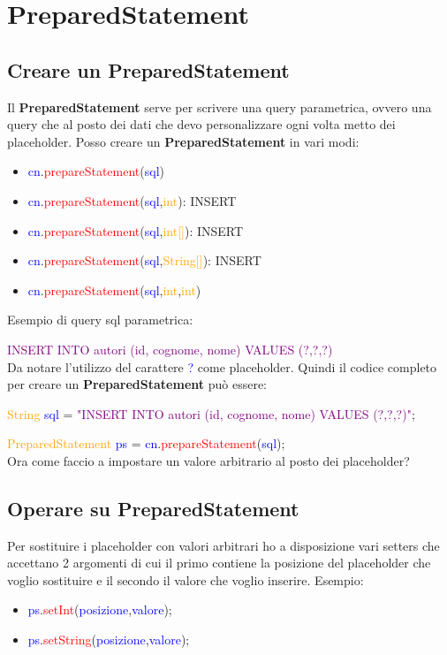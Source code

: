 \documentclass[11pt, letterpaper, titlepage]{article}
\begin{document}
\section{PreparedStatement}

\subsection{Creare un PreparedStatement}
Il \textbf{PreparedStatement} serve per scrivere una query parametrica, ovvero una query che
al posto dei dati che devo personalizzare ogni volta metto dei placeholder. Posso
creare un \textbf{PreparedStatement} in vari modi:
\begin{itemize}
    \item \textcolor{blue}{cn}.\textcolor{red}{prepareStatement}({\textcolor{blue}{sql}})
    \item \textcolor{blue}{cn}.\textcolor{red}{prepareStatement}({\textcolor{blue}{sql},\textcolor{orange}{int}}): INSERT
    \item \textcolor{blue}{cn}.\textcolor{red}{prepareStatement}({\textcolor{blue}{sql},\textcolor{orange}{int[]}}): INSERT
    \item \textcolor{blue}{cn}.\textcolor{red}{prepareStatement}({\textcolor{blue}{sql},\textcolor{orange}{String[]}}): INSERT
    \item \textcolor{blue}{cn}.\textcolor{red}{prepareStatement}({\textcolor{blue}{sql},\textcolor{orange}{int},\textcolor{orange}{int}})
\end{itemize}
Esempio di query sql parametrica:\par
\textcolor{purple}{INSERT INTO autori (id, cognome, nome) VALUES (?,?,?)}\\
Da notare l'utilizzo del carattere \textcolor{blue}{?} come placeholder. Quindi il
codice completo per creare un \textbf{PreparedStatement} può essere:\par
\textcolor{orange}{String} \textcolor{blue}{sql} = \textcolor{purple}{"INSERT INTO autori (id, cognome, nome) VALUES (?,?,?)"};\par
\textcolor{orange}{PreparedStatement} \textcolor{blue}{ps} = \textcolor{blue}{cn}.\textcolor{red}{prepareStatement}(\textcolor{blue}{sql});\\
Ora come faccio a impostare un valore arbitrario al posto dei placeholder?

\subsection{Operare su PreparedStatement}
Per sostituire i placeholder con valori arbitrari ho a disposizione vari setters che
accettano 2 argomenti di cui il primo contiene la posizione del placeholder che voglio
sostituire e il secondo il valore che voglio inserire. Esempio:
\begin{itemize}
    \item \textcolor{blue}{ps}.\textcolor{red}{setInt}(\textcolor{blue}{posizione},\textcolor{blue}{valore});
    \item \textcolor{blue}{ps}.\textcolor{red}{setString}(\textcolor{blue}{posizione},\textcolor{blue}{valore});
\end{itemize}
\end{document}
